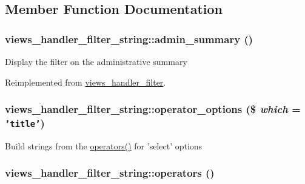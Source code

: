 \subsection{Member Function Documentation}
\hypertarget{classviews__handler__filter__string_3152b0f2ce38cf493327e2a91b9c9f5e}{
\subsubsection[{admin\_\-summary}]{\setlength{\rightskip}{0pt plus 5cm}views\_\-handler\_\-filter\_\-string::admin\_\-summary ()}}
\label{classviews__handler__filter__string_3152b0f2ce38cf493327e2a91b9c9f5e}


Display the filter on the administrative summary 

Reimplemented from \hyperlink{classviews__handler__filter_655263cd0b73188eec064b9a9743fe4c}{views\_\-handler\_\-filter}.\hypertarget{classviews__handler__filter__string_9b6d71fc1698780860f2ec9ff84f2b46}{
\subsubsection[{operator\_\-options}]{\setlength{\rightskip}{0pt plus 5cm}views\_\-handler\_\-filter\_\-string::operator\_\-options (\$ {\em which} = {\tt 'title'})}}
\label{classviews__handler__filter__string_9b6d71fc1698780860f2ec9ff84f2b46}


Build strings from the \hyperlink{classviews__handler__filter__string_db301581372054e2f66faab09e47004e}{operators()} for 'select' options \hypertarget{classviews__handler__filter__string_db301581372054e2f66faab09e47004e}{
\subsubsection[{operators}]{\setlength{\rightskip}{0pt plus 5cm}views\_\-handler\_\-filter\_\-string::operators ()}}
\label{classviews__handler__filter__string_db301581372054e2f66faab09e47004e}


